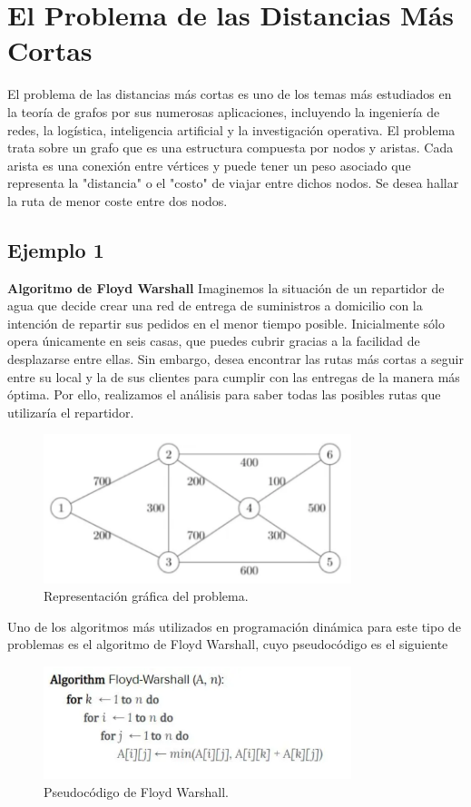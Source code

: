 \section{El Problema de las Distancias Más Cortas}
El problema de las distancias más cortas es uno de los temas más estudiados en la teoría de grafos por sus numerosas aplicaciones, incluyendo la ingeniería de redes, la logística, inteligencia artificial y la investigación operativa. El problema trata sobre un grafo que es una estructura compuesta por nodos y aristas. Cada arista es una conexión entre vértices y puede tener un peso asociado que representa la "distancia" o el "costo" de viajar entre dichos nodos. Se desea hallar la ruta de menor coste entre dos nodos.

\subsection{Ejemplo 1}
\textbf{Algoritmo de Floyd Warshall}
Imaginemos la situación de un repartidor de agua que decide crear una red de entrega de suministros a domicilio con la intención de repartir sus pedidos en el menor tiempo posible. Inicialmente sólo opera únicamente en seis casas, que puedes cubrir gracias a la facilidad de desplazarse entre ellas.
Sin embargo, desea encontrar las rutas más cortas a seguir entre su local y la de sus clientes para cumplir con las entregas de la manera más óptima. Por ello, realizamos el análisis para saber todas las posibles rutas que utilizaría el repartidor.
\begin{figure}[H]
	\centering
	\includegraphics[width=0.8\textwidth]{distancias_cortas_RepresentacionG1.png}
	\caption{Representación gráfica del problema.}
	\label{fig:resultado}
\end{figure}

Uno de los algoritmos más utilizados en programación dinámica para este tipo de problemas es el algoritmo de Floyd Warshall, cuyo pseudocódigo es el siguiente
\begin{figure}[H]
	\centering
	\includegraphics[width=0.8\textwidth]{distancias_cortas_Pseudo1.png}
	\caption{Pseudocódigo de Floyd Warshall.}
	\label{fig:resultado}
\end{figure}

